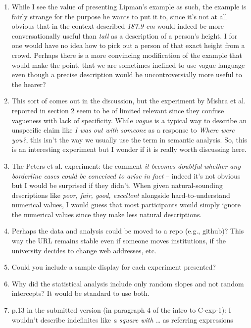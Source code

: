 \documentclass{tufte-handout}
\begin{document}
\begin{enumerate}
\item While I see the value of presenting Lipman's example as such, the example is fairly strange for the purpose he wants to put it to, since it's not at all obvious that in the context described \emph{187.9 cm} would indeed be more conversationally useful than \emph{tall} as a description of a person's height. I for one would have no idea how to pick out a person of that exact height from a crowd. Perhaps there is a more convincing modification of the example that would make the point, that we are sometimes inclined to use vague language even though a precise description would be uncontroversially more useful to the hearer?

\item This sort of comes out in the discussion, but the experiment by Mishra et al. reported in section 2 seem to be of limited relevant since they confuse vagueness with lack of specificity. While \emph{vague} is a typical way to describe an unspecific claim like \emph{I was out with someone} as a response to \emph{Where were you?}, this isn't the way we usually use the term in semantic analysis. So, this is an interesting experiment but I wonder if it is really worth discussing here.

\item The Peters et al. experiment: the comment \emph{it becomes doubtful whether any borderline cases could be conceived to arise in fact} -- indeed it's not obvious but I would be surprised if they didn't. When given natural-sounding descriptions like \emph{poor, fair, good, excellent} alongside hard-to-understand numerical values, I would guess that most participants would simply ignore the numerical values since they make less natural descriptions.

\item Perhaps the data and analysis could be moved to a repo (e.g., github)? This way the URL remains stable even if someone moves institutions, if the university decides to change web addresses, etc. 

\item Could you include a sample display for each experiment presented?

\item Why did the statistical analysis include only random slopes and not random intercepts? It would be standard to use both.

\item p.13 in the submitted version (in paragraph 4 of the intro to C-exp-1): I wouldn't describe indefinites like \emph{a square with \ldots} as referring expressions


\end{enumerate}
\end{document}
